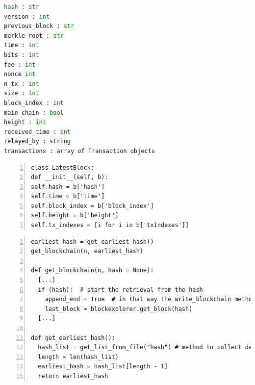 \documentclass[USenglish]{uit-thesis}
\begin{document}
\begin{appendices}

\begin{lstlisting}[float, frame=single, caption={Json object returned from the method \emph{get\_block()} in the Bitcoin \gls{api} class blockexplorer.py\,\cite{bitcoin_api}}, language=Python]
hash : str
version : int
previous_block : str
merkle_root : str
time : int
bits : int
fee : int
nonce int
n_tx : int
size : int
block_index : int
main_chain : bool
height : int
received_time : int
relayed_by : string
transactions : array of Transaction objects
\end{lstlisting}


\begin{lstlisting}[float, numbers=left,frame=single,caption={Structure of the latest block retrieved. The function get\_latest\_block() will return an object with this structure.}]
class LatestBlock:
def __init__(self, b):
self.hash = b['hash']
self.time = b['time']
self.block_index = b['block_index']
self.height = b['height']
self.tx_indexes = [i for i in b['txIndexes']]
\end{lstlisting}


\begin{lstlisting}[float, numbers=left, frame=single, caption={Collecting data starting from the last element in the blockchain.txt file.}]
earliest_hash = get_earliest_hash()
get_blockchain(n, earliest_hash)

def get_blockchain(n, hash = None):
  [...]
  if (hash):  # start the retrieval from the hash
    append_end = True  # in that way the write_blockchain method knows that has to append blocks and not write them at the beginning
    last_block = blockexplorer.get_block(hash)
  [...]

def get_earliest_hash():
  hash_list = get_list_from_file("hash") # method to collect data from blockchain.txt file having as attribute "hash"
  length = len(hash_list)
  earliest_hash = hash_list[length - 1]
  return earliest_hash
\end{lstlisting}



\end{appendices}
\end{document}
